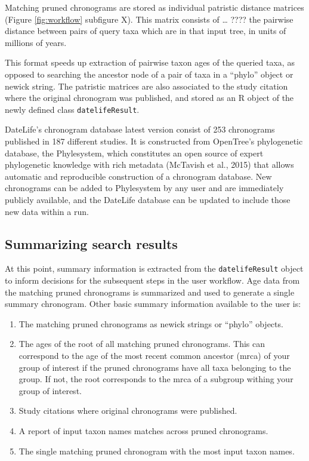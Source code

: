 \documentclass[
  english,
  man]{apa6}
\providecommand{\tightlist}{%
  \setlength{\itemsep}{0pt}\setlength{\parskip}{0pt}}
\begin{document}
Matching pruned chronograms are stored as individual patristic distance matrices (Figure \ref{fig:workflow} subfigure X).
This matrix consists of \ldots{} ???? the pairwise distance between pairs of query taxa which are in that input tree, in units of millions of years.

This format speeds up extraction of pairwise taxon ages of the queried taxa, as opposed to searching the ancestor node of a pair of taxa in a ``phylo'' object or newick string.
The patristic matrices are also associated to the study citation where the original chronogram was published, and stored as an R object of the newly defined class \texttt{datelifeResult}.

DateLife's chronogram database latest version consist of 253 chronograms published in 187 different studies. It is constructed from OpenTree's phylogenetic database, the Phylesystem, which constitutes an open source of expert phylogenetic knowledge with rich metadata (McTavish et al., 2015) that allows automatic and reproducible construction of a chronogram database.
New chronograms can be added to Phylesystem by any user and are immediately publicly available, and the DateLife database can be updated to include those new data within a run.

\hypertarget{summarizing-search-results}{%
\subsection{Summarizing search results}\label{summarizing-search-results}}

At this point, summary information is extracted from the \texttt{datelifeResult} object to inform decisions for the subsequent steps in the user workflow. Age data from the matching pruned chronograms is summarized and used to generate a single summary chronogram. Other basic summary information available to the user is:

\begin{enumerate}
\def\labelenumi{\arabic{enumi}.}
\tightlist
\item
  The matching pruned chronograms as newick strings or ``phylo'' objects.
\item
  The ages of the root of all matching pruned chronograms. This can correspond to the age of the most recent common ancestor (mrca) of your group of interest if the pruned chronograms have all taxa belonging to the group. If not, the root corresponds to the mrca of a subgroup withing your group of interest.
\item
  Study citations where original chronograms were published.
\item
  A report of input taxon names matches across pruned chronograms.
\item
  The single matching pruned chronogram with the most input taxon names.
\end{enumerate}
\end{document}
